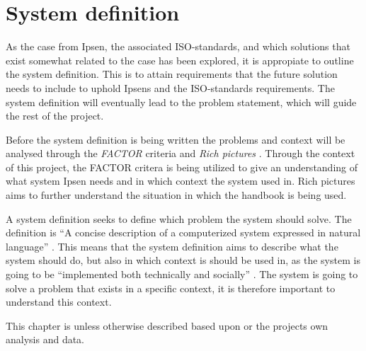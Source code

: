 \section{System definition}\label{sec:SystemDefinition}
As the case from Ipsen, the associated ISO-standards, and which solutions that exist somewhat related to the case has been explored, it is appropiate to outline the system definition.
This is to attain requirements that the future solution needs to include to uphold Ipsens and the ISO-standards requirements.
The system definition will eventually lead to the problem statement, which will guide the rest of the project.

Before the system definition is being written the problems and context will be analysed through the \textit{FACTOR} criteria and \textit{Rich pictures} \citep{Rod-Aalborg}.
Through the context of this project, the FACTOR critera is being utilized to give an understanding of what system Ipsen needs and in which context the system used in.
Rich pictures aims to further understand the situation in which the handbook is being used.

A system definition seeks to define which problem the system should solve. 
The definition is “A concise description of a computerized system expressed in natural language” \citep[p.~24]{Rod-Aalborg}. 
This means that the system definition aims to describe what the system should do, but also in which context is should be used in, as the system is going to be “implemented both technically and socially” \citep[p.~23]{Rod-Aalborg}. 
The system is going to solve a problem that exists in a specific context, it is therefore important to understand this context.

This chapter is unless otherwise described based upon \cite{Rod-Aalborg} or the projects own analysis and data.

